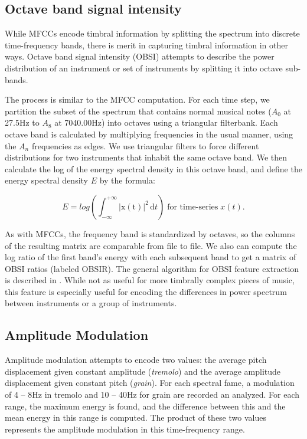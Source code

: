 \documentclass[12pt,twocolumn,titlepage]{article}
\begin{document}
\subsection{Octave band signal intensity}

While MFCCs encode timbral information by splitting the spectrum into discrete time-frequency bands, there is merit in capturing timbral information in other ways. Octave band signal intensity (OBSI) attempts to describe the power distribution of an instrument or set of instruments by splitting it into octave sub-bands. 


The process is similar to the MFCC computation. For each time step, we partition the subset of the spectrum that contains normal musical notes ($A_0$ at 27.5Hz to $A_8$ at 7040.00Hz) into octaves using a triangular filterbank. Each octave band is calculated by multiplying frequencies in the usual manner, using the $A_n$ frequencies as edges. We use triangular filters to force different distributions for two instruments that inhabit the same octave band. We then calculate the log of the energy spectral density in this octave band, and define the energy spectral density $E$
 by the formula: \cite{Oppenheim}

\begin{equation}\label{}
E = log\left(\int_{-\infty}^{+\infty} \mathrm{|x(t)|}^2\, \mathrm{d}t\right) \; \text{for time-series} \; x(t).
\end{equation}

As with MFCCs, the frequency band is standardized by octaves, so the columns of the resulting matrix are comparable from file to file. We also can compute the log ratio of the first band's energy with each subsequent band to get a matrix of OBSI ratios (labeled OBSIR). The general algorithm for OBSI feature extraction is described in \cite{Essid}. While not as useful for more timbrally complex pieces of music, this feature is especially useful for encoding the differences in power spectrum between instruments or a group of instruments. 

\subsection{Amplitude Modulation}

Amplitude modulation attempts to encode two values: the average pitch displacement given constant amplitude (\emph{tremolo}) and the average amplitude displacement given constant pitch (\emph{grain}). \cite{Eronen} For each spectral fame, a modulation of 4 -- 8Hz in tremolo and 10 -- 40Hz for grain are recorded an analyzed. For  each range, the maximum energy is found, and the difference between this and the mean energy in this range is computed. \cite{yaafe} The product of these two values represents the amplitude modulation in this time-frequency range.
\end{document}
